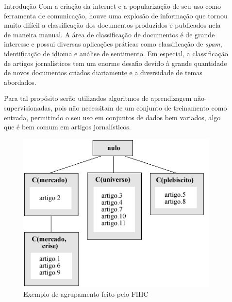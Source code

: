 \documentclass[final]{beamer}
\newlength{\sepwid}
\newlength{\onecolwid}
\newlength{\twocolwid}
\begin{document}
\begin{frame}[t]
\begin{columns}[t]
\begin{column}{\onecolwid}
\begin{block}{Introdução}
Com a criação da internet e a popularização de seu uso como ferramenta de comunicação, houve uma explosão de informação que tornou muito difícil a classificação dos documentos produzidos e publicados nela de maneira manual. A área de classificação de documentos é de grande interesse e possui diversas aplicações práticas como classificação de \textit{spam}, identificação de idioma e análise de sentimento. Em especial, a classificação de artigos jornalísticos tem um enorme desafio devido à grande quantidade de novos documentos criados diariamente e a diversidade de temas abordados. %

Para tal propósito serão utilizados algoritmos de aprendizagem não-supervisionadas, pois não necessitam de um conjunto de treinamento como entrada, permitindo o seu uso em conjuntos de dados bem variados, algo que é bem comum em artigos jornalísticos.

\end{block}


\begin{figure}
\includegraphics[width=0.5\linewidth]{fihc.png}
\caption{Exemplo de agrupamento feito pelo FIHC}
\end{figure}


\end{column} %

\begin{column}{\sepwid}\end{column} %

\begin{column}{\twocolwid} %

\begin{columns}[t,totalwidth=\twocolwid] %


\end{columns}
\end{column}
\end{columns}
\end{frame}
\end{document}
